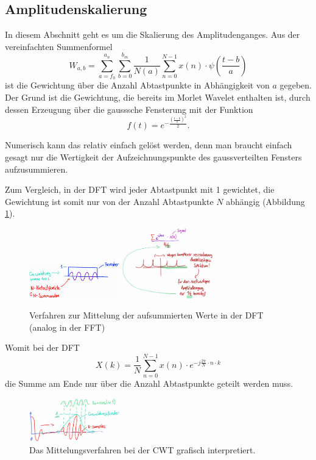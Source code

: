 \subsection{Amplitudenskalierung
	\label{wavelets:subsection:Amplitudenskalierung}}
In diesem Abschnitt geht es um die Skalierung des Amplitudenganges.
Aus der vereinfachten Summenformel \[W_{a,b}=\sum_{a=f_0}^{a_n}\sum_{b=0}^{b_m}\frac{1}{N(a)}\sum_{n=0}^{N-1} x(n)\cdot\psi\left(\frac{t-b}{a}\right)\] ist die Gewichtung über die Anzahl Abtastpunkte in Abhängigkeit von $a$ gegeben. Der Grund ist die Gewichtung, die bereits im Morlet Wavelet enthalten ist, durch dessen Erzeugung über die gausssche Fensterung mit der Funktion \[f(t)=e^{-\frac{\left(\frac{t-b}{a}\right)^2}{2}}.\]

Numerisch kann das relativ einfach gelöst werden, denn man braucht einfach gesagt nur die Wertigkeit der Aufzeichnungspunkte des gaussverteilten Fensters aufzusummieren.

Zum Vergleich, in der DFT wird jeder Abtastpunkt mit 1 gewichtet, die Gewichtung ist somit nur von der Anzahl Abtastpunkte $N$ abhängig (Abbildung \ref{wavelet:fig:AmpSklal1u2}).
\begin{figure}
	\centering
	\includegraphics[width=0.35\textwidth]{papers/wavelets/images/11-1_AmpSklal1.png}
	\includegraphics[width=0.35\textwidth]{papers/wavelets/images/11-2_AmpSklal2.png}
	\caption{Verfahren zur Mittelung der aufsummierten Werte in der DFT (analog in der FFT)}
	\label{wavelet:fig:AmpSklal1u2}
\end{figure}
Womit bei der DFT \[X(k)=\frac{1}{N}\sum_{n=0}^{N-1}x(n)\cdot e^{-j\frac{2\pi}{N}\cdot n \cdot k}\] die Summe am Ende nur über die Anzahl Abtastpunkte geteilt werden muss.

\begin{figure}
	\centering
	\includegraphics[width=0.35\textwidth]{papers/wavelets/images/11-3_AmpSklal3.png}
	\caption{Das Mittelungsverfahren bei der CWT grafisch interpretiert.}
	\label{wavelet:fig:AmpSklal3}
\end{figure}

